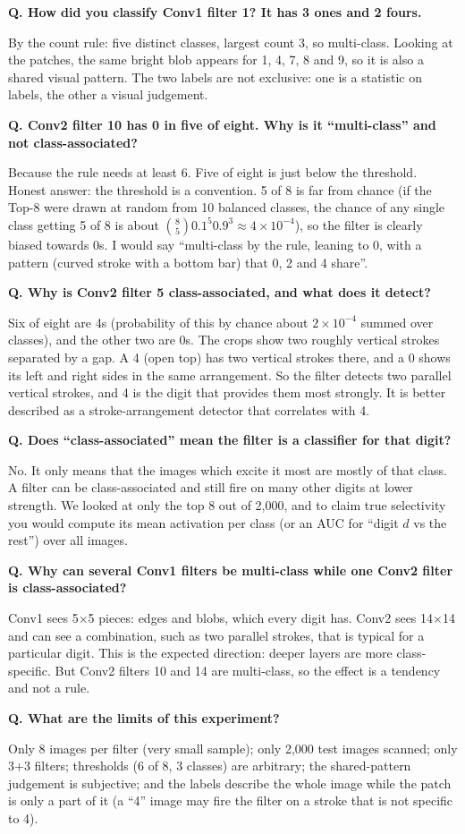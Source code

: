 \documentclass[11pt]{article}
\newcommand{\Q}[1]{\par\vspace{4pt}\noindent\textcolor{qcol}{\textbf{Q. #1}}\par\nopagebreak}
\newcommand{\A}[1]{\noindent #1\par}
\begin{document}
\Q{How did you classify Conv1 filter 1? It has 3 ones and 2 fours.}
\A{By the count rule: five distinct classes, largest count 3, so multi-class. Looking at the patches, the same bright blob appears for 1, 4, 7, 8 and 9, so it is also a shared visual pattern. The two labels are not exclusive: one is a statistic on labels, the other a visual judgement.}

\Q{Conv2 filter 10 has 0 in five of eight. Why is it ``multi-class'' and not class-associated?}
\A{Because the rule needs at least 6. Five of eight is just below the threshold. Honest answer: the threshold is a convention. 5 of 8 is far from chance (if the Top-8 were drawn at random from 10 balanced classes, the chance of any single class getting 5 of 8 is about $\binom85 0.1^5 0.9^3\approx4\times10^{-4}$), so the filter is clearly biased towards 0s. I would say ``multi-class by the rule, leaning to 0, with a pattern (curved stroke with a bottom bar) that 0, 2 and 4 share''.}

\Q{Why is Conv2 filter 5 class-associated, and what does it detect?}
\A{Six of eight are 4s (probability of this by chance about $2\times10^{-4}$ summed over classes), and the other two are 0s. The crops show two roughly vertical strokes separated by a gap. A 4 (open top) has two vertical strokes there, and a 0 shows its left and right sides in the same arrangement. So the filter detects two parallel vertical strokes, and 4 is the digit that provides them most strongly. It is better described as a stroke-arrangement detector that correlates with 4.}

\Q{Does ``class-associated'' mean the filter is a classifier for that digit?}
\A{No. It only means that the images which excite it most are mostly of that class. A filter can be class-associated and still fire on many other digits at lower strength. We looked at only the top 8 out of 2,000, and to claim true selectivity you would compute its mean activation per class (or an AUC for ``digit $d$ vs the rest'') over all images.}

\Q{Why can several Conv1 filters be multi-class while one Conv2 filter is class-associated?}
\A{Conv1 sees 5$\times$5 pieces: edges and blobs, which every digit has. Conv2 sees 14$\times$14 and can see a combination, such as two parallel strokes, that is typical for a particular digit. This is the expected direction: deeper layers are more class-specific. But Conv2 filters 10 and 14 are multi-class, so the effect is a tendency and not a rule.}

\Q{What are the limits of this experiment?}
\A{Only 8 images per filter (very small sample); only 2,000 test images scanned; only 3+3 filters; thresholds (6 of 8, 3 classes) are arbitrary; the shared-pattern judgement is subjective; and the labels describe the whole image while the patch is only a part of it (a ``4'' image may fire the filter on a stroke that is not specific to 4).}
\end{document}

